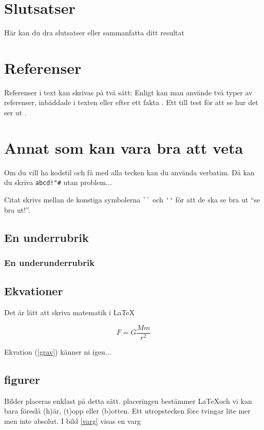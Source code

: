 \documentclass[11p]{article}
\begin{document}
 \section{Slutsatser}
 Här kan du dra slutsatser eller sammanfatta ditt resultat


 \section{Referenser}
 Referenser i text kan skrivas på två sätt: Enligt \textcite{Jens} kan man använde två typer av referenser, inbäddade i texten eller efter ett fakta \parencite{Fraenkel}. Ett till test för att se hur det ser ut \parencite[sid 55]{fermi}.

 \section{Annat som kan vara bra att veta}
 Om du vill ha kodstil och få med alla tecken kan du använda verbatim. Då kan du skriva \verb|abcd!"#| utan problem...

 Citat skrivs mellan de konstiga symbolerna \verb|``| och \verb|''| för att de ska se bra ut ``se bra ut!''.
 \subsection{En underrubrik}
 \subsubsection{En underunderrubrik}
 \subsection{Ekvationer}
 Det är lätt att skriva matematik i \LaTeX


 \begin{equation}
  F = G \frac{M m}{r^2}
  \label{grav}
 \end{equation}

 Ekvation (\ref{grav}) känner ni igen...

 \subsection{figurer}
 Bilder placeras enklast på detta sätt. placeringen bestämmer \LaTeX och vi kan bara föreslå (h)är, (t)opp eller (b)otten. Ett utropstecken före tvingar lite mer men inte absolut. I bild \ref{varg} visas en varg

 \printbibliography
\end{document}
